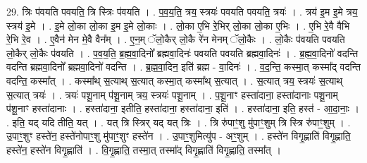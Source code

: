 \documentclass[17pt]{extarticle}
\begin{document}
29. त्रिः प॑वयति पवयति॒ त्रि स्त्रिः प॑वयति । . प॒व॒य॒ति॒ त्रय॒ स्त्रयः॑ पवयति पवयति॒ त्रयः॑ । . त्रय॑ इ॒म इ॒मे त्रय॒ स्त्रय॑ इ॒मे । . इ॒मे लो॒का लो॒का इ॒म इ॒मे लो॒काः । . लो॒का ए॒भि रे॒भिर् लो॒का लो॒का ए॒भिः । . ए॒भि रे॒वै वैभि रे॒भि रे॒व । . ए॒वैन॑ मेन मे॒वै वैन᳚म् । . ए॒न॒म् ॅलो॒कैर् लो॒कै रे॑न मेनम् ॅलो॒कैः । . लो॒कैः प॑वयति पवयति लो॒कैर् लो॒कैः प॑वयति । . प॒व॒य॒ति॒ ब्र॒ह्म॒वा॒दिनो᳚ ब्रह्मवा॒दिनः॑ पवयति पवयति ब्रह्मवा॒दिनः॑ । . ब्र॒ह्म॒वा॒दिनो॑ वदन्ति वदन्ति ब्रह्मवा॒दिनो᳚ ब्रह्मवा॒दिनो॑ वदन्ति । . ब्र॒ह्म॒वा॒दिन॒ इति॑ ब्रह्म - वा॒दिनः॑ । . व॒द॒न्ति॒ कस्मा॒त् कस्मा᳚द् वदन्ति वदन्ति॒ कस्मा᳚त् । . कस्मा᳚थ् स॒त्याथ् स॒त्यात् कस्मा॒त् कस्मा᳚थ् स॒त्यात् । . स॒त्यात् त्रय॒ स्त्रयः॑ स॒त्याथ् स॒त्यात् त्रयः॑ । . त्रयः॑ पशू॒नाम् प॑शू॒नाम् त्रय॒ स्त्रयः॑ पशू॒नाम् । . प॒शू॒नाꣳ हस्ता॑दाना॒ हस्ता॑दानाः पशू॒नाम् प॑शू॒नाꣳ हस्ता॑दानाः । . हस्ता॑दाना॒ इतीति॒ हस्ता॑दाना॒ हस्ता॑दाना॒ इति॑ । . हस्ता॑दाना॒ इति॒ हस्त॑ - आ॒दा॒नाः॒ । . इति॒ यद् यदि तीति॒ यत् । . यत् त्रि स्त्रिर् यद् यत् त्रिः । . त्रि रु॑पाꣳ॒॒शु मु॑पाꣳ॒॒शुम् त्रि स्त्रि रु॑पाꣳ॒॒शुम् । . उ॒पाꣳ॒॒शुꣳ हस्ते॑न॒ हस्ते॑नोपाꣳ॒॒शु मु॑पाꣳ॒॒शुꣳ हस्ते॑न । . उ॒पाꣳ॒॒शुमित्यु॑प - अꣳ॒॒शुम् । . हस्ते॑न विगृ॒ह्णाति॑ विगृ॒ह्णाति॒ हस्ते॑न॒ हस्ते॑न विगृ॒ह्णाति॑ । . वि॒गृ॒ह्णाति॒ तस्मा॒त् तस्मा᳚द् विगृ॒ह्णाति॑ विगृ॒ह्णाति॒ तस्मा᳚त् । \newline
\end{document}
